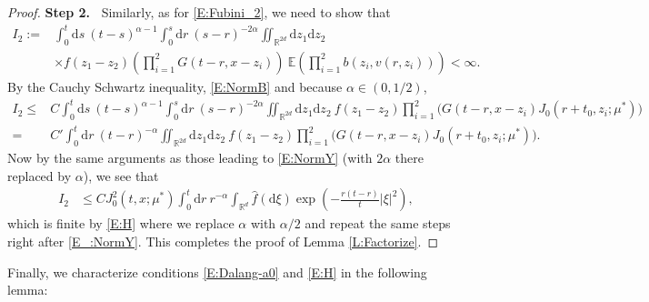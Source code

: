 \documentclass[12pt]{report}
\theoremstyle{plain}
\theoremstyle{definition}
\numberwithin{equation}{section}
\newcommand{\R}{\mathbb{R}}
\newcommand{\E}{\mathbb{E}}
\newcommand{\ud}{\ensuremath{ \mathrm{d} }}
\begin{document}
\begin{proof}
	{\bf\noindent Step 2.~} Similarly, as for \eqref{E:Fubini_2}, we need to show that
	\begin{align*}
	I_2:= & \int_0^t \ud s \: (t-s)^{\alpha-1} \int_0^s \ud r\: (s-r)^{-2\alpha} \iint_{\R^{2d}} \ud z_1\ud z_2\: \\
	& \times f(z_1-z_2) \left(  \prod_{i=1}^{2} G(t-r,x-z_i)\right)  \: \E\left(\prod_{i=1}^{2}b(z_i,v(r,z_i))\right) < \infty.
	\end{align*}
	By the Cauchy Schwartz inequality, \eqref{E:NormB} and because $\alpha\in (0,1/2)$,
	\begin{align*}
	I_2\le & C \int_0^t \ud s \: (t-s)^{\alpha-1} \int_0^s \ud r\: (s-r)^{-2\alpha} \iint_{\R^{2d}} \ud z_1\ud z_2\:f(z_1-z_2) \prod_{i=1}^{2}\bigg(  G(t-r,x-z_i) J_0\left(r + t_0,z_i;\mu^*\right)\bigg) \\
	= & C' \int_0^t \ud r \: (t-r)^{-\alpha}  \iint_{\R^{2d}} \ud z_1\ud z_2\:f(z_1-z_2) \prod_{i=1}^{2}\bigg(  G(t-r,x-z_i) J_0\left(r + t_0, z_i;\mu^*\right)\bigg).
	\end{align*}
	Now by the same arguments as those leading to \eqref{E:NormY} (with $2\alpha$ there replaced by
	$\alpha$), we see that
	\begin{align*}
	I_2 & \le C J_0^2\left(t,x; \mu^*\right) \int_0^t \ud r \: r^{-\alpha} \int_{\R^d} \widehat{f}(\ud \xi)\exp\left(-\frac{r(t-r)}{t}|\xi|^2\right),
	\end{align*}
	which is finite by \eqref{E:H} where we replace $\alpha$ with $\alpha/2$ and repeat the same steps
	right after \eqref{E_:NormY}. This completes the proof of Lemma \ref{L:Factorize}.
\end{proof}

Finally, we characterize conditions \eqref{E:Dalang-a0} and \eqref{E:H} in the following lemma:
\end{document}

